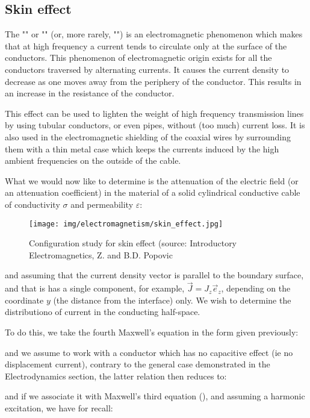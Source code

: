 	\pagebreak
	\subsection{Skin effect}
	The "" or "" (or, more rarely, "") is an electromagnetic phenomenon which makes that at high frequency a current tends to circulate only at the surface of the conductors. This phenomenon of electromagnetic origin exists for all the conductors traversed by alternating currents. It causes the current density to decrease as one moves away from the periphery of the conductor. This results in an increase in the resistance of the conductor.

	This effect can be used to lighten the weight of high frequency transmission lines by using tubular conductors, or even pipes, without (too much) current loss. It is also used in the electromagnetic shielding of the coaxial wires by surrounding them with a thin metal case which keeps the currents induced by the high ambient frequencies on the outside of the cable.
	
	What we would now like to determine is the attenuation of the electric field (or an attenuation coefficient) in the material of a solid cylindrical conductive cable of conductivity $\sigma$ and permeability $\varepsilon$:
	\begin{figure}[H]
		\centering
		\texttt{[image: img/electromagnetism/skin\_effect.jpg]}
		\caption{Configuration study for skin effect (source: Introductory Electromagnetics, Z. and B.D. Popovic}
	\end{figure}
	and assuming that the current density vector is parallel to the boundary surface, and that is has a single component, for example, $\vec{J}=J_z\vec{e}_z$, depending on the coordinate $y$ (the distance from the interface) only. We wish to determine the distributiono of current in the conducting half-space.
	
	To do this, we take the fourth Maxwell's equation in the form given previously:
	
	and we assume to work with a conductor which has no capacitive effect (ie no displacement current), contrary to the general case demonstrated in the Electrodynamics section, the latter relation then reduces to:
	
	and if we associate it with Maxwell's third equation (), and assuming a harmonic excitation, we have for recall:
	
